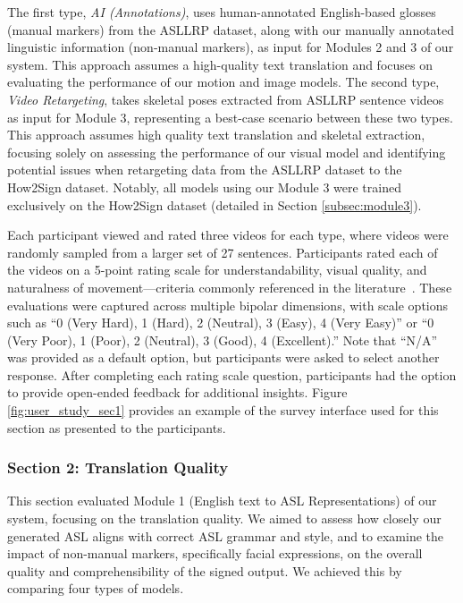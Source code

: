 The first type, \textit{AI (Annotations)}, uses human-annotated English-based glosses (manual markers) from the ASLLRP dataset, along with our manually annotated linguistic information (non-manual markers), as input for Modules 2 and 3 of our system. This approach assumes a high-quality text translation and focuses on evaluating the performance of our motion and image models. The second type, \textit{Video Retargeting}, takes skeletal poses extracted from ASLLRP sentence videos as input for Module 3, representing a best-case scenario between these two types. This approach assumes high quality text translation and skeletal extraction, focusing solely on assessing the performance of our visual model and identifying potential issues when retargeting data from the ASLLRP dataset to the How2Sign dataset. Notably, all models using our Module 3 were trained exclusively on the How2Sign dataset (detailed in Section \ref{subsec:module3}).

Each participant viewed and rated three videos for each type, where videos were randomly sampled from a larger set of 27 sentences. Participants rated each of the videos on a 5-point rating scale for understandability, visual quality, and naturalness of movement---criteria commonly referenced in the literature~\cite{huenerfauth2007evaluating,quandt2022attitudes}. These evaluations were captured across multiple bipolar dimensions, with scale options such as ``0 (Very Hard), 1 (Hard), 2 (Neutral), 3 (Easy), 4 (Very Easy)'' or ``0 (Very Poor), 1 (Poor), 2 (Neutral), 3 (Good), 4 (Excellent).'' Note that ``N/A'' was provided as a default option, but participants were asked to select another response. After completing each rating scale question, participants had the option to provide open-ended feedback for additional insights. Figure \ref{fig:user_study_sec1} provides an example of the survey interface used for this section as presented to the participants. 



\subsubsection{Section 2: Translation Quality}\label{subsubsec:sec2}
This section evaluated Module 1 (English text to ASL Representations) of our system, focusing on the translation quality. We aimed to assess how closely our generated ASL aligns with correct ASL grammar and style, and to examine the impact of non-manual markers, specifically facial expressions, on the overall quality and comprehensibility of the signed output. We achieved this by comparing four types of models.

